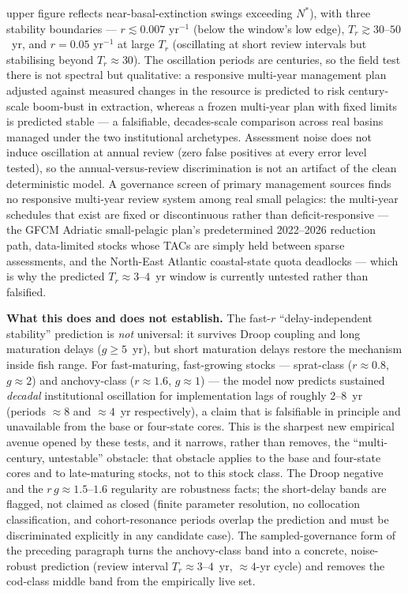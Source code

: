 \documentclass[twocolumn,10pt]{article}
\begin{document}
upper figure reflects near-basal-extinction swings exceeding $N^*$), with three stability boundaries --- $r\lesssim0.007$ yr$^{-1}$ (below the window's low edge), $T_r\gtrsim30$--$50$~yr, and $r=0.05$ yr$^{-1}$ at large $T_r$ (oscillating at short review intervals but stabilising beyond $T_r\approx30$). The oscillation periods are centuries, so the field test there is not spectral but qualitative: a responsive multi-year management plan adjusted against measured changes in the resource is predicted to risk century-scale boom-bust in extraction, whereas a frozen multi-year plan with fixed limits is predicted stable --- a falsifiable, decades-scale comparison across real basins managed under the two institutional archetypes. Assessment noise does not induce oscillation at annual review (zero false positives at every error level tested), so the annual-versus-review discrimination is not an artifact of the clean deterministic model. A governance screen of primary management sources finds no responsive multi-year review system among real small pelagics: the multi-year schedules that exist are fixed or discontinuous rather than deficit-responsive --- the GFCM Adriatic small-pelagic plan's predetermined 2022--2026 reduction path, data-limited stocks whose TACs are simply held between sparse assessments, and the North-East Atlantic coastal-state quota deadlocks --- which is why the predicted $T_r\approx3$--$4$~yr window is currently untested rather than falsified.

\textbf{What this does and does not establish.} The fast-$r$ ``delay-independent stability'' prediction is \emph{not} universal: it survives Droop coupling and long maturation delays ($g\ge5$~yr), but short maturation delays restore the mechanism inside fish range. For fast-maturing, fast-growing stocks --- sprat-class ($r\approx0.8$, $g\approx2$) and anchovy-class ($r\approx1.6$, $g\approx1$) --- the model now predicts sustained \emph{decadal} institutional oscillation for implementation lags of roughly $2$--$8$~yr (periods $\approx8$ and $\approx4$~yr respectively), a claim that is falsifiable in principle and unavailable from the base or four-state cores. This is the sharpest new empirical avenue opened by these tests, and it narrows, rather than removes, the ``multi-century, untestable'' obstacle: that obstacle applies to the base and four-state cores and to late-maturing stocks, not to this stock class. The Droop negative and the $r\,g\approx1.5$--$1.6$ regularity are robustness facts; the short-delay bands are flagged, not claimed as closed (finite parameter resolution, no collocation classification, and cohort-resonance periods overlap the prediction and must be discriminated explicitly in any candidate case). The sampled-governance form of the preceding paragraph turns the anchovy-class band into a concrete, noise-robust prediction (review interval $T_r\approx3$--$4$~yr, $\approx4$-yr cycle) and removes the cod-class middle band from the empirically live set.
\end{document}
